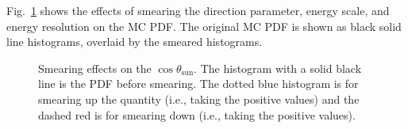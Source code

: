 Fig.~\ref{smearESpdfs} shows the effects of smearing the direction parameter, energy scale, and energy resolution on the MC PDF. The original MC PDF is shown as black solid line histograms, overlaid by the smeared histograms.

\begin{figure}[htbp]
	\centering
	\caption[Smearing effects on the $\cos\theta_\mathrm{sun}$ PDF.]{Smearing effects on the $\cos\theta_\mathrm{sun}$. The histogram with a solid black line is the PDF before smearing. The dotted blue histogram is for smearing up the quantity (i.e., taking the positive values) and the dashed red is for smearing down (i.e., taking the positive values).\label{smearESpdfs}}
\end{figure}

